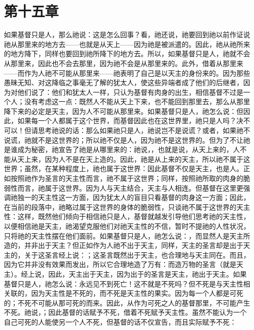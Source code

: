 \section{第十五章}

\par

如果基督只是人，那么祂说：这是怎么回事？看，祂还说，祂要回到祂以前作证说祂从那里来的地方去——也就是从天上——因为祂是被派遣的。因此，祂从祂所来的地方降下，同样也要回到祂所降下的地方去。所以，如果基督只是人，祂就不会从那里来，因此也不会去那里，因为祂不会是从那里来的。此外，借着从那里来——而作为人祂不可能从那里来——祂表明了自己是以天主的身份来的。因为那些愚昧无知、对这降临之事毫无了解的犹太人，使这些异端者成了他们的后继者，因为对他们说了：他们和犹太人一样，只认为基督有肉身的出生，相信基督不过是一个人；没有考虑这一点：既然人不能从天上下来，也不能回到那里去，那么从那里降下来的必定是天主，因为人不可能从那里来。如果基督只是人，祂怎么说：但因此，如果每一个人都属于这个世界，而基督因此也在这世界里，祂只是人吗？决不可以！但请思考祂说的话：那么如果祂只是人，祂说岂不是说谎？或者，如果祂不说谎，祂就不是这世界的；所以祂不仅是人，因为祂不是这世界的。但为了不让祂是谁成为秘密，祂宣告了祂是从哪里来的：祂说，，也就是说，从天上来的，人不能从天上来，因为人不是在天上造的。因此，祂是从上来的天主，所以祂不属于这世界；虽然，在某种程度上，祂也属于这世界：因此基督不仅是天主，也是人。正如按照祂作为圣言的天主性而言，祂不属于这世界；同样，按照祂所取的肉身的脆弱性而言，祂属于这世界。因为人与天主结合，天主与人相连。但基督在这里更强调祂独一的天主性这一方面，因为犹太人的盲目只看基督的肉身这一方面；因此，在当前的段落中，祂略过属于这世界的身体的脆弱性，只谈祂不属于这世界的天主性：这样，既然他们倾向于相信祂只是人，基督就越发引导他们思考祂的天主性，以便相信祂是天主，祂渴望克服他们对祂天主性的不信，暂时不提祂的人性状况，只将祂的天主性摆在他们面前。如果基督只是人，祂怎么说：，而显然人是天主所造的，并非出于天主？但正如作为人祂不出于天主，同样，天主的圣言却是出于天主的，关于这圣言经上说：；这圣言既然出于天主，也合理地与天主同在。而且，因为它并非没有效果而发出，所以它合理地造了万有：而造万物的圣言（就是天主）。经上说，因此，天主出于天主，因为出于的圣言是天主，祂出于天主。如果基督只是人，祂怎么说：永远见不到死亡！这不就是不死吗？但不死是与天主性相关联的，因为天主性是不死的，而不死是天主性的果实。因为每一个人都是可死的；不死不可能从那可死的而来。因此，从作为可死之人的基督那里，不可能产生不死。祂说，；因此基督的话赋予不死，借着不死赋予天主性。虽然不能认为一个自己可死的人能使另一个人不死，但基督的话不仅宣告，而且实际赋予不死：